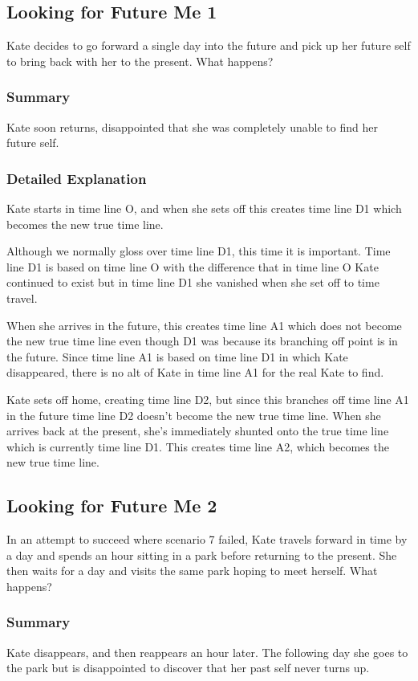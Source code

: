 \begin{multicols*}{2}
\subsection{Looking for Future Me 1}
Kate decides to go forward a single day into the future and pick up her future self to bring back with her to the present. What happens?

\subsubsection{Summary}
Kate soon returns, disappointed that she was completely unable to find her future self.

\subsubsection{Detailed Explanation}
Kate starts in time line O, and when she sets off this creates time line D1 which becomes the new true time line.

Although we normally gloss over time line D1, this time it is important. Time line D1 is based on time line O with the difference that in time line O Kate continued to exist but in time line D1 she vanished when she set off to time travel.

When she arrives in the future, this creates time line A1 which does not become the new true time line even though D1 was because its branching off point is in the future. Since time line A1 is based on time line D1 in which Kate disappeared, there is no alt of Kate in time line A1 for the real Kate to find.

Kate sets off home, creating time line D2, but since this branches off time line A1 in the future time line D2 doesn’t become the new true time line. When she arrives back at the present, she’s immediately shunted onto the true time line which is currently time line D1. This creates time line A2, which becomes the new true time line.

\subsection{Looking for Future Me 2}
In an attempt to succeed where scenario 7 failed, Kate travels forward in time by a day and spends an hour sitting in a park before returning to the present. She then waits for a day and visits the same park hoping to meet herself. What happens? 

\subsubsection{Summary}
Kate disappears, and then reappears an hour later. The following day she goes to the park but is disappointed to discover that her past self never turns up.


\end{multicols*}
